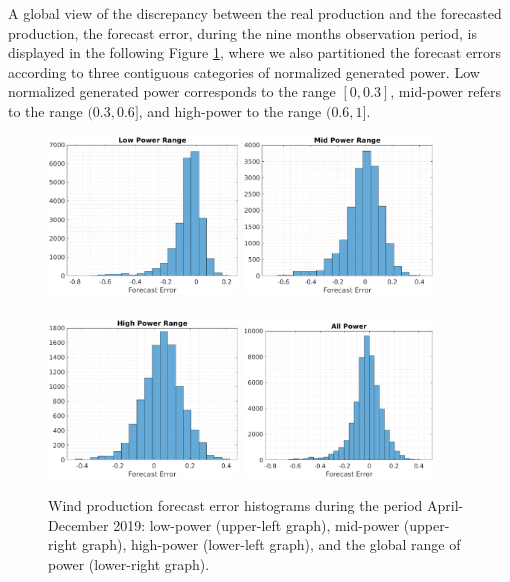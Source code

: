\documentclass[11pt]{article}
\theoremstyle{definition}
\begin{document}
A global view of the discrepancy between the real production and the forecasted production, the forecast error, during the nine months observation period, is displayed in the following Figure \ref{fig:data_curtailing}, where we also partitioned the forecast errors according to three contiguous categories of normalized generated power. Low normalized generated power corresponds to the range $[0,0.3]$, mid-power refers to the range $(0.3,0.6]$, and high-power to the range $(0.6,1]$.

\begin{figure}[H]
\centering
\includegraphics[width=0.45\textwidth]{plots/LP_6.eps}
\includegraphics[width=0.45\textwidth]{plots/MP_6.eps}\\
\quad\\
\includegraphics[width=0.45\textwidth]{plots/HP_6.eps}
\includegraphics[width=0.45\textwidth]{plots/AP_6.eps}
\caption{Wind production forecast error histograms during the period April-December 2019: low-power (upper-left graph), mid-power (upper-right graph), high-power (lower-left graph), and the global range of power (lower-right graph).}
  \label{fig:data_curtailing}
\end{figure}
\end{document}

